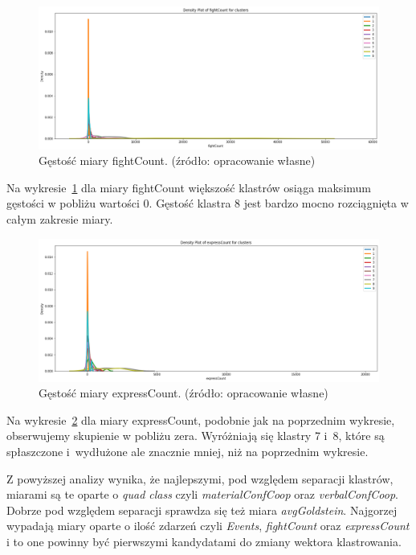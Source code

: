 \documentclass[11pt]{report}
\begin{document}
    \begin{figure}[!htp]
        \centering
        \includegraphics[width=\linewidth]{fig/CLUST/density_fightCount.png}
        \caption{Gęstość miary fightCount. (źródło: opracowanie własne)}
        \label{fig:density_fightcount}
    \end{figure}
    Na wykresie~\ref{fig:density_fightcount} dla miary fightCount większość klastrów osiąga maksimum gęstości w pobliżu wartości 0.
    Gęstość klastra 8 jest bardzo mocno rozciągnięta w całym zakresie miary.

    \begin{figure}[!htp]
        \centering
        \includegraphics[width=\linewidth]{fig/CLUST/density_expressCount.png}
        \caption{Gęstość miary expressCount. (źródło: opracowanie własne)}
        \label{fig:density_expresscount}
    \end{figure}
    Na wykresie~\ref{fig:density_expresscount} dla miary expressCount, podobnie jak na poprzednim wykresie, obserwujemy skupienie w pobliżu zera.
    Wyróżniają się klastry 7 i~8, które są spłaszczone i~wydłużone ale znacznie mniej, niż na poprzednim wykresie.

    Z powyższej analizy wynika, że najlepszymi, pod względem separacji klastrów, miarami są te oparte o \textit{quad class} czyli \textit{materialConfCoop} oraz \textit{verbalConfCoop}.
    Dobrze pod względem separacji sprawdza się też miara \textit{avgGoldstein}.
    Najgorzej wypadają miary oparte o ilość zdarzeń czyli \textit{Events}, \textit{fightCount} oraz \textit{expressCount} i to one powinny być pierwszymi kandydatami do zmiany wektora klastrowania.
\end{document}
